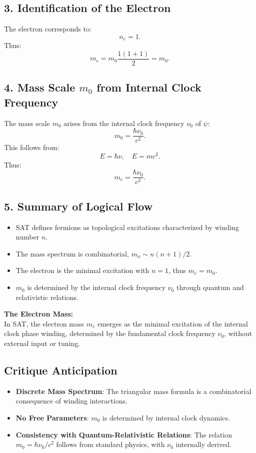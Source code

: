 \documentclass[12pt]{article}
\begin{document}
\subsection*{3. Identification of the Electron}
The electron corresponds to:
\[
n_e = 1.
\]
Thus:
\[
m_e = m_0 \frac{1(1+1)}{2} = m_0.
\]

\subsection*{4. Mass Scale \(m_0\) from Internal Clock Frequency}
The mass scale \(m_0\) arises from the internal clock frequency \(\nu_0\) of \(\psi\):
\[
m_0 = \frac{\hbar \nu_0}{c^2}.
\]
This follows from:
\[
E = \hbar \nu, \quad E = m c^2.
\]
Thus:
\[
m_e = \frac{\hbar \nu_0}{c^2}.
\]

\subsection*{5. Summary of Logical Flow}
\begin{itemize}
    \item SAT defines fermions as topological excitations characterized by winding number \(n\).
    \item The mass spectrum is combinatorial, \(m_n \sim n(n+1)/2\).
    \item The electron is the minimal excitation with \(n=1\), thus \(m_e = m_0\).
    \item \(m_0\) is determined by the internal clock frequency \(\nu_0\) through quantum and relativistic relations.
\end{itemize}

\begin{mdframed}[linewidth=1pt, roundcorner=5pt, backgroundcolor=white]
\textbf{The Electron Mass:} \\
In SAT, the electron mass \( m_e \) emerges as the minimal excitation of the internal clock phase winding, determined by the fundamental clock frequency \( \nu_0 \), without external input or tuning.
\end{mdframed}

\subsection*{Critique Anticipation}
\begin{itemize}
    \item \textbf{Discrete Mass Spectrum}: The triangular mass formula is a combinatorial consequence of winding interactions.
    \item \textbf{No Free Parameters}: \(m_0\) is determined by internal clock dynamics.
    \item \textbf{Consistency with Quantum-Relativistic Relations}: The relation \(m_0 = \hbar \nu_0 / c^2\) follows from standard physics, with \(\nu_0\) internally derived.
\end{itemize}
\end{document}

